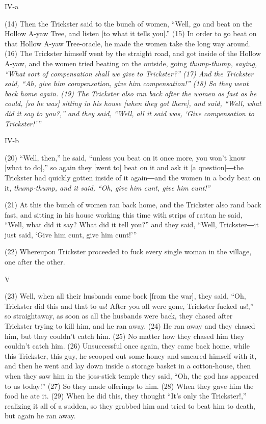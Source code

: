 \begin{center}
IV-a
\end{center}

\leftskip=0pt
(14) Then the Trickster said to the bunch of women, ``Well, go and beat on the
Hollow A-yaw Tree, and listen [to what it tells you].'' (15) In order to go beat
on that Hollow A-yaw Tree-oracle, he made the women take the long way around. (16)
The Trickster himself went by the straight road, and got inside of the Hollow A-yaw,
and the women tried beating on the outside, going \textit{thump-thump, saying,
``What sort of compensation shall we give to Trickster?'' (17) And the Trickster
said, ``Ah, give him compensation, give him compensation!'' (18) So they went back
home again. (19) The Trickster also ran back after the women as fast as he could,
[so he was] sitting in his house [when they got there], and said, ``Well, what
did it say to you?,'' and they said, ``Well, all it said was, `Give compensation
to Trickster!'''}

IV-b

(20) ``Well, then,'' he said, ``unless you beat on it once more, you won't know
[what to do],'' so again they [went to] beat on it and ask it [a question]―the
Trickster had quickly gotten inside of it again―and the women in a body beat
on it,\textit{ thump-thump, and it said, ``Oh, give him cunt, give him cunt!''}

(21) At this the bunch of women ran back home, and the Trickster also rand back
fast, and sitting in his house working this time with strips of rattan he said,
``Well, what did it say? What did it tell you?'' and they said, ``Well, Trickster―it
just said, `Give him cunt, give him cunt!'''

(22) Whereupon Trickster proceeded to fuck every single woman in the village, one
after the other.

\begin{center}
V
\end{center}

\leftskip=0pt
(23) Well, when all their husbands came back [from the war], they said, ``Oh, Trickster
did this and that to us! After you all were gone, Trickster fucked us!,'' so straightaway,
as soon as all the husbands were back, they chased after Trickster trying to kill
him, and he ran away. (24) He ran away and they chased him, but they couldn't catch
him. (25) No matter how they chased him they couldn't catch him. (26) Unsuccessful
once again, they came back home, while this Trickster, this guy, he scooped out
some honey and smeared himself with it, and then he went and lay down inside a
storage basket in a cotton-house, then when they saw him in the joss-stick temple
they said, ``Oh, the god has appeared to us today!'' (27) So they made offerings
to him. (28) When they gave him the food he ate it. (29) When he did this, they
thought ``It's only the Trickster!,'' realizing it all of a sudden, so they grabbed
him and tried to beat him to death, but again he ran away.

